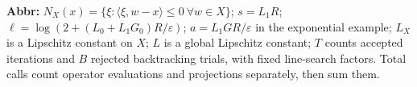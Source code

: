 \begin{table}[tp]
\begin{threeparttable}
\begin{tablenotes}[flushleft]
\item[] \textbf{Abbr:} $N_X(x)=\{\xi:\langle\xi,w-x\rangle\le0\ \forall w\in X\}$; $s=L_1R$; $\ell=\log(2+(L_0+L_1G_0)R/\varepsilon)$; $a=L_1GR/\varepsilon$ in the exponential example; $L_X$ is a Lipschitz constant on $X$; $L$ is a global Lipschitz constant; $T$ counts accepted iterations and $B$ rejected backtracking trials, with fixed line-search factors. Total calls count operator evaluations and projections separately, then sum them.
\end{tablenotes}
\end{threeparttable}
\end{table}
\clearpage
